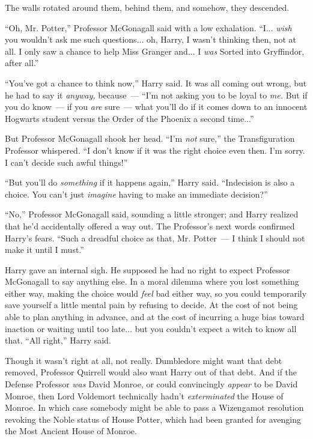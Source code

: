 The walls rotated around them, behind them, and somehow, they descended.

``Oh, Mr. Potter,'' Professor McGonagall said with a low exhalation. ``I... \emph{wish} you wouldn't ask me such questions... oh, Harry, I wasn't thinking then, not at all. I only saw a chance to help Miss Granger and... I \emph{was} Sorted into Gryffindor, after all.''

``You've got a chance to think now,'' Harry said. It was all coming out wrong, but he had to say it \emph{anyway,} because~--- ``I'm not asking you to be loyal to \emph{me.} But if you do know~--- if you \emph{are} sure~--- what you'll do if it comes down to an innocent Hogwarts student versus the Order of the Phoenix a second time...''

But Professor McGonagall shook her head. ``I'm \emph{not} sure,'' the Transfiguration Professor whispered. ``I don't know if it was the right choice even then. I'm sorry. I can't decide such awful things!''

``But you'll do \emph{something} if it happens again,'' Harry said. ``Indecision is also a choice. You can't just \emph{imagine} having to make an immediate decision?''

``No,'' Professor McGonagall said, sounding a little stronger; and Harry realized that he'd accidentally offered a way out. The Professor's next words confirmed Harry's fears. ``Such a dreadful choice as that, Mr. Potter~--- I think I should not make it until I must.''

Harry gave an internal sigh. He supposed he had no right to expect Professor McGonagall to say anything else. In a moral dilemma where you lost something either way, making the choice would \emph{feel} bad either way, so you could temporarily save yourself a little mental pain by refusing to decide. At the cost of not being able to plan anything in advance, and at the cost of incurring a huge bias toward inaction or waiting until too late... but you couldn't expect a witch to know all that. ``All right,'' Harry said.

Though it wasn't right at all, not really. Dumbledore might want that debt removed, Professor Quirrell would also want Harry out of that debt. And if the Defense Professor \emph{was} David Monroe, or could convincingly \emph{appear} to be David Monroe, then Lord Voldemort technically hadn't \emph{exterminated} the House of Monroe. In which case somebody might be able to pass a Wizengamot resolution revoking the Noble status of House Potter, which had been granted for avenging the Most Ancient House of Monroe.

